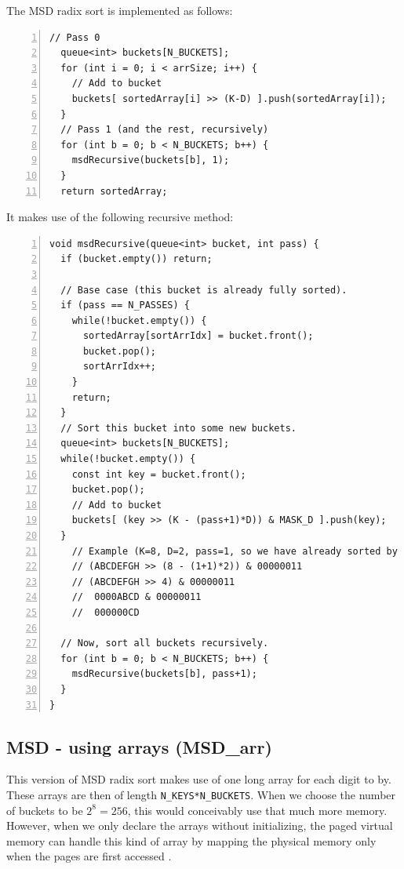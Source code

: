 The MSD radix sort is implemented as follows:
\begin{lstlisting}[numbers=left]
  // Pass 0
  queue<int> buckets[N_BUCKETS];
  for (int i = 0; i < arrSize; i++) {
    // Add to bucket
    buckets[ sortedArray[i] >> (K-D) ].push(sortedArray[i]);
  }
  // Pass 1 (and the rest, recursively)
  for (int b = 0; b < N_BUCKETS; b++) {
    msdRecursive(buckets[b], 1);
  }
  return sortedArray;
\end{lstlisting}

It makes use of the following recursive method:
\begin{lstlisting}[numbers=left]
void msdRecursive(queue<int> bucket, int pass) {
  if (bucket.empty()) return;
  
  // Base case (this bucket is already fully sorted).
  if (pass == N_PASSES) {
    while(!bucket.empty()) {
      sortedArray[sortArrIdx] = bucket.front();
      bucket.pop();
      sortArrIdx++;
    }
    return;
  }
  // Sort this bucket into some new buckets.
  queue<int> buckets[N_BUCKETS];
  while(!bucket.empty()) {
    const int key = bucket.front();
    bucket.pop();
    // Add to bucket
    buckets[ (key >> (K - (pass+1)*D)) & MASK_D ].push(key);
  }
    // Example (K=8, D=2, pass=1, so we have already sorted by AB, and now we look at CD):
    // (ABCDEFGH >> (8 - (1+1)*2)) & 00000011
    // (ABCDEFGH >> 4) & 00000011
    //  0000ABCD & 00000011
    //  000000CD

  // Now, sort all buckets recursively.
  for (int b = 0; b < N_BUCKETS; b++) {
    msdRecursive(buckets[b], pass+1);
  }
}
\end{lstlisting}

\subsection{MSD - using arrays (MSD\_arr)}
This version of MSD radix sort makes use of one long array for each digit to by.
These arrays are then of length \verb!N_KEYS*N_BUCKETS!. When we choose the number of buckets to be $2^8=256$, this would conceivably use that much more memory.
However, when we only declare the arrays without initializing, the paged virtual memory can handle this kind of array by mapping the physical memory only when the pages are first accessed \citep{radixSort}.


